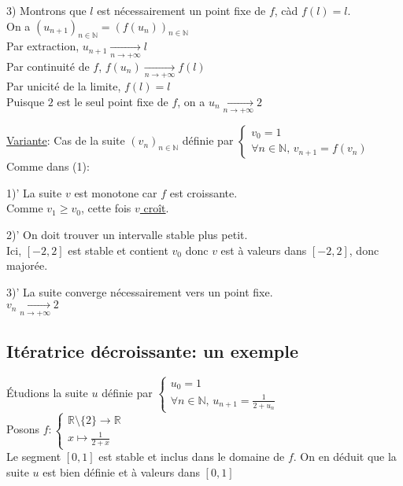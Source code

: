 \documentclass[10pt,a4paper]{article}
\theoremstyle{definition}
\begin{document}
3) Montrons que $l$ est nécessairement un point fixe de $f$, càd $f(l) = l$. \\
On a $(u_{n + 1})_{n \in \mathbb{N}} = (f(u_n))_{n \in \mathbb{N}}$ \\
Par extraction, $u_{n + 1} \xrightarrow[n \to +\infty]{} l$ \\
Par continuité de $f$, $f(u_n) \xrightarrow[n \to +\infty]{} f(l)$ \\
Par unicité de la limite, $f(l) = l$\\
Puisque $2$ est le seul point fixe de $f$, on a $u_n \xrightarrow[n \to +\infty]{} 2$ \medskip

\noindent \uline{Variante}: Cas de la suite $(v_n)_{n \in \mathbb{N}}$ définie par $\begin{cases}
v_0 = 1 \\ \forall n \in \mathbb{N},\, v_{n + 1} = f(v_n)
\end{cases}$ \\
Comme dans (1): \medskip

1)' La suite $v$ est monotone car $f$ est croissante. \\
Comme $v_1 \geq v_0$, cette fois \uline{$v$ croît}. \medskip

2)' On doit trouver un intervalle stable plus petit. \\
Ici, $[-2, 2]$ est stable et contient $v_0$ donc $v$ est à valeurs dans $[-2, 2]$, donc majorée. \medskip

3)' La suite converge nécessairement vers un point fixe. \\
$v_n \xrightarrow[n \to +\infty]{} 2$

\pagebreak

\subsection{Itératrice décroissante: un exemple}
\noindent Étudions la suite $u$ définie par $\begin{cases}
u_0 = 1 \\ \forall n \in \mathbb{N},\, u_{n + 1} = \frac{1}{2 + u_n}
\end{cases}$ \\
Posons $f: \begin{cases}
\mathbb{R} \setminus \{ 2 \} \to \mathbb{R} \\ x \mapsto \frac{1}{2 + x}
\end{cases}$ \\
Le segment $[0, 1]$ est stable et inclus dans le domaine de $f$. On en déduit que la suite $u$ est bien définie et à valeurs dans $[0, 1]$ \medskip
\end{document}

